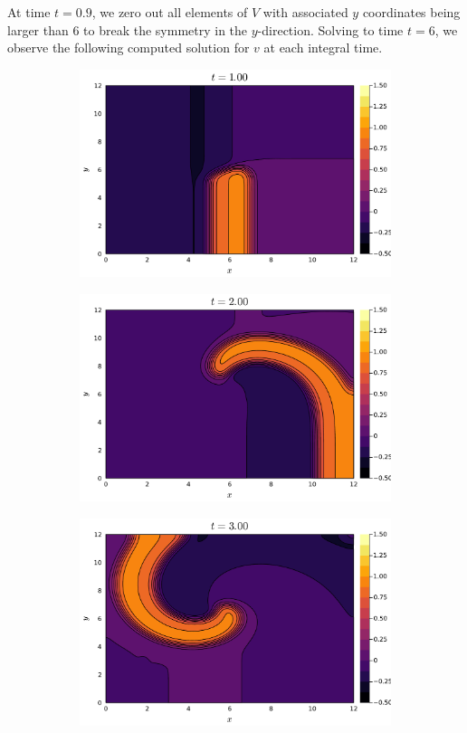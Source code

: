 \documentclass{article}
\begin{document}
At time $t=0.9$, we zero out all elements of \(V\) with
associated \(y\) coordinates being larger than \(6\) to break the
symmetry in the \(y\)-direction. Solving to time $t=6$, we observe the following computed solution for $v$ at each integral time. 
\begin{figure}[H]
	\centering
	\begin{subfigure}{0.3\linewidth}
		\centering
		\includegraphics[width=\linewidth]{prob6_t=1.pdf}
	\end{subfigure}
	\begin{subfigure}{0.3\linewidth}
		\centering
		\includegraphics[width=\linewidth]{prob6_t=2.pdf}
	\end{subfigure}
	\begin{subfigure}{0.3\linewidth}
		\centering
		\includegraphics[width=\linewidth]{prob6_t=3.pdf}

\end{subfigure}
\end{figure}
\end{document}
